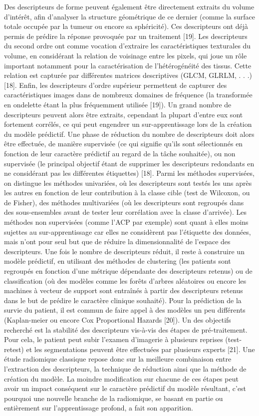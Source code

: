 \documentclass[]{memoir}
\begin{document}
Des descripteurs de forme peuvent également être directement extraits du volume d’intérêt, afin d’analyser la structure géométrique de ce dernier (comme la surface totale occupée par la tumeur ou encore sa sphéricité). Ces descripteurs ont déjà permis de prédire la réponse provoquée par un traitement [19].
Les descripteurs du second ordre ont comme vocation d’extraire les caractéristiques texturales du volume, en considérant la relation de voisinage entre les pixels, qui joue un rôle important notamment pour la caractérisation de l’hétérogénéité des tissus. Cette relation est capturée par différentes matrices descriptives (GLCM, GLRLM, . . .) [18].
Enfin, les descripteurs d’ordre supérieur permettent de capturer des caractéristiques images dans de nombreux domaines de fréquence (la transformée en ondelette étant la plus fréquemment utilisée [19]).
Un grand nombre de descripteurs peuvent alors être extraits, cependant la plupart d’entre eux sont fortement corrélés, ce qui peut engendrer un sur-apprentissage lors de la création du modèle prédictif. Une phase de réduction du nombre de descripteurs doit alors être effectuée, de manière supervisée (ce qui signifie qu’ils sont sélectionnés en fonction de leur caractère prédictif au regard de la tâche souhaitée), ou non supervisée (le principal objectif étant de supprimer les descripteurs redondants en ne considérant pas les différentes étiquettes) [18].
Parmi les méthodes supervisées, on distingue les méthodes univariées, où les descripteurs sont testés les uns après les autres en fonction de leur contribution à la classe cible (test de Wilcoxon, ou de Fisher), des méthodes multivariées (où les descripteurs sont regroupés dans des sous-ensembles avant de tester leur corrélation avec la classe d’arrivée).
Les méthodes non supervisées (comme l’ACP par exemple) sont quant à elles moins sujettes au sur-apprentissage car elles ne considèrent pas l’étiquette des données, mais n’ont pour seul but que de réduire la dimensionnalité de l’espace des descripteurs.
Une fois le nombre de descripteurs réduit, il reste à construire un modèle prédictif, en utilisant des méthodes de clustering (les patients sont regroupés en fonction d’une métrique dépendante des descripteurs retenus) ou de classification (où des modèles comme les forêts d’arbres aléatoires ou encore les machines à vecteur de support sont entraînés à partir des descripteurs retenus dans le but de prédire le caractère clinique souhaité). Pour la prédiction de la survie du patient, il est commun de faire appel à des modèles un peu différents (Kaplan-meier ou encore Cox Proportional Hazards [20]).
Un des objectifs recherché est la stabilité des descripteurs vis-à-vis des étapes de pré-traitement. Pour cela, le patient peut subir l’examen d’imagerie à plusieurs reprises (test-retest) et les segmentations peuvent être effectuées par plusieurs experts [21].
Une étude radiomique classique repose donc sur la meilleure combinaison entre l’extraction des descripteurs, la technique de réduction ainsi que la méthode de création du modèle.
La moindre modification sur chacune de ces étapes peut avoir un impact conséquent sur le caractère prédictif du modèle résultant, c’est pourquoi une nouvelle branche de la radiomique, se basant en partie ou entièrement sur l’apprentissage profond, a fait son apparition.
\end{document}
